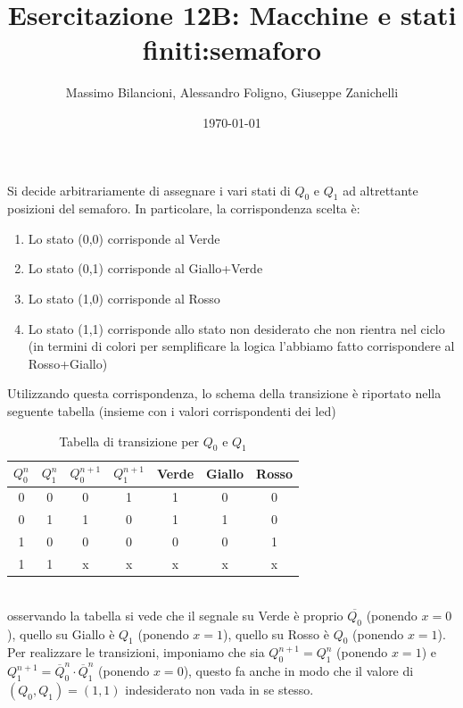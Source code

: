 \documentclass[12pt,a4paper]{article}
\date{\today}
\title{Esercitazione 12B: Macchine e stati finiti:semaforo}
\author{Massimo Bilancioni, Alessandro Foligno, Giuseppe Zanichelli}
\begin{document}
	
\maketitle
Si decide arbitrariamente di assegnare i vari stati di $Q_0$ e $Q_1$ ad altrettante posizioni del semaforo. In particolare, la corrispondenza scelta è:\\
\begin{enumerate}
	\item Lo stato (0,0) corrisponde al Verde
	\item Lo stato (0,1) corrisponde al Giallo+Verde
	\item Lo stato (1,0) corrisponde al Rosso
	\item Lo stato (1,1) corrisponde allo stato non desiderato che non rientra nel ciclo (in termini di colori per semplificare la  logica  l'abbiamo fatto corrispondere al Rosso+Giallo)
\end{enumerate}
Utilizzando questa corrispondenza, lo schema della transizione è riportato nella seguente tabella (insieme con i valori corrispondenti dei led)\
\begin{table}[h]\centering
\begin{tabular}{|c|c|c|c|c|c|c|}
	\hline 
	$Q_0^n$ & $Q_1^n$ & $Q_0^{n+1}$ & $Q_1^{n+1}$ & Verde & Giallo & Rosso \\ 
	\hline 
	0 & 0 & 0 & 1 & 1 & 0 & 0 \\ 
	\hline 
	0 & 1 & 1 & 0 & 1 & 1 & 0 \\ 
	\hline 
	1 & 0 & 0 & 0 & 0 & 0 & 1 \\ 
	\hline 
	1 & 1 & x & x & x & x & x \\ 
	\hline 
\end{tabular} 	
\caption{Tabella di transizione per $Q_0$ e $Q_1$}
\end{table}
\\

osservando la tabella si vede che il segnale su Verde è proprio $\overline{Q_0}$ (ponendo $x =0$), quello su Giallo è $Q_1$ (ponendo $x= 1$), quello su Rosso è $Q_0$ (ponendo $x= 1$).\\
Per realizzare le transizioni, imponiamo che sia $Q_0^{n+1}=Q_1^n$ (ponendo $x= 1$)  e $Q_1^{n+1}=\overline{Q}_0^n \cdot \overline{Q}_1^n$ (ponendo $x= 0$), questo fa anche in modo che il valore di $(Q_0,Q_1)=(1,1)$ indesiderato non vada in se stesso.\\
\end{document}
